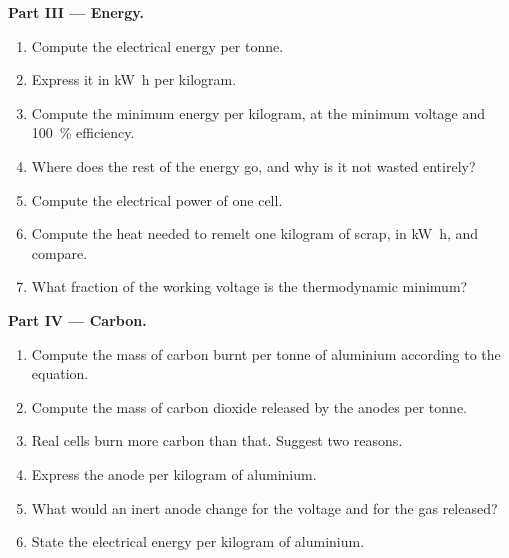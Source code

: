 \begin{problem}
\medskip
\noindent\textbf{Part III --- Energy.}
\begin{enumerate}[resume]
  \item Compute the electrical energy per tonne.
  \item Express it in \unit{kW.h} per kilogram.
  \item Compute the minimum energy per kilogram, at the minimum voltage and
        100~\% efficiency.
  \item Where does the rest of the energy go, and why is it not wasted
        entirely?
  \item Compute the electrical power of one cell.
  \item Compute the heat needed to remelt one kilogram of scrap, in
        \unit{kW.h}, and compare.
  \item What fraction of the working voltage is the thermodynamic minimum?
\end{enumerate}

\medskip
\noindent\textbf{Part IV --- Carbon.}
\begin{enumerate}[resume]
  \item Compute the mass of carbon burnt per tonne of aluminium according to the
        equation.
  \item Compute the mass of carbon dioxide released by the anodes per tonne.
  \item Real cells burn more carbon than that. Suggest two reasons.
  \item Express the anode  per kilogram of aluminium.
  \item What would an inert anode change for the voltage and for the gas
        released?
  \item State the electrical energy per kilogram of aluminium.
\end{enumerate}
\end{problem}
